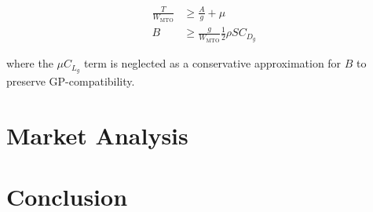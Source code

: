 \documentclass[]{aiaa-tc}%
\begin{document}
\begin{align}
    \frac{T}{W_{\mathrm{MTO}}} &\geq \frac{A}{g} + \mu \\
    B &\geq \frac{g}{W_{\mathrm{MTO}}} \frac{1}{2} \rho S C_{D_g}
\end{align}

where the $\mu C_{L_g}$ term is neglected as a conservative approximation for $B$ to preserve GP-compatibility. 

\section{Market Analysis}

\section{Conclusion}



\end{document}
